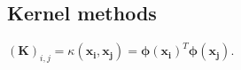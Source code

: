 \documentclass[10pt,a4paper,landscape]{article}
\renewcommand{\bf}[1]{\ensuremath{\mathbf{#1}}}
\newcommand{\bbeta}{\boldsymbol\beta}
\renewcommand{\vec}{\mathbf}
\begin{document}
\begin{multicols*}{4}
%
%
%
%
%
%
%
%
%

\section{Kernel methods}
%
$(\bf{K})_{i,j} = \kappa(\bf{x_i}, \bf{x_j}) = \vec \phi(\bf{x_i})^T \vec \phi(\bf{x_j})$.


\end{multicols*}
\end{document}
